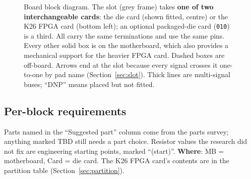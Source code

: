 \documentclass[10pt,a4paper]{article}
\begin{document}
\begin{figure}[H]
\caption[Board block diagram]{Board block diagram. The slot (grey frame) takes \textbf{one of two interchangeable cards}: the die card (shown fitted, centre) or the K26 FPGA card (bottom left); an optional packaged-die card (\texttt{010}) is a third. All carry the same terminations and use the same pins. Every other solid box is on the motherboard, which also provides a mechanical support for the heavier FPGA card. Dashed boxes are off-board. Arrows end at the slot because every signal crosses it one-to-one by pad name (Section~\ref{sec:slot}). Thick lines are multi-signal buses; ``DNP'' means placed but not fitted.}
\label{fig:block}
\end{figure}

\subsection{Per-block requirements}
Parts named in the ``Suggested part'' column come from the parts survey; anything marked TBD still needs a part choice. Resistor values the research did not fix are engineering starting points, marked ``(start)''. \textbf{Where}: MB = motherboard, Card = die card. The K26 FPGA card's contents are in the partition table (Section~\ref{sec:partition}).
\end{document}
